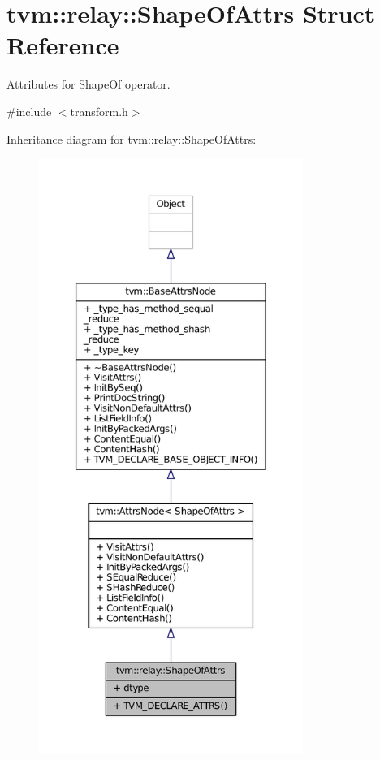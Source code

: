 \hypertarget{structtvm_1_1relay_1_1ShapeOfAttrs}{}\section{tvm\+:\+:relay\+:\+:Shape\+Of\+Attrs Struct Reference}
\label{structtvm_1_1relay_1_1ShapeOfAttrs}


Attributes for Shape\+Of operator.  




{\ttfamily \#include $<$transform.\+h$>$}



Inheritance diagram for tvm\+:\+:relay\+:\+:Shape\+Of\+Attrs\+:
\nopagebreak
\begin{figure}[H]
\begin{center}
\leavevmode
\includegraphics[height=550pt]{structtvm_1_1relay_1_1ShapeOfAttrs__inherit__graph}
\end{center}
\end{figure}


